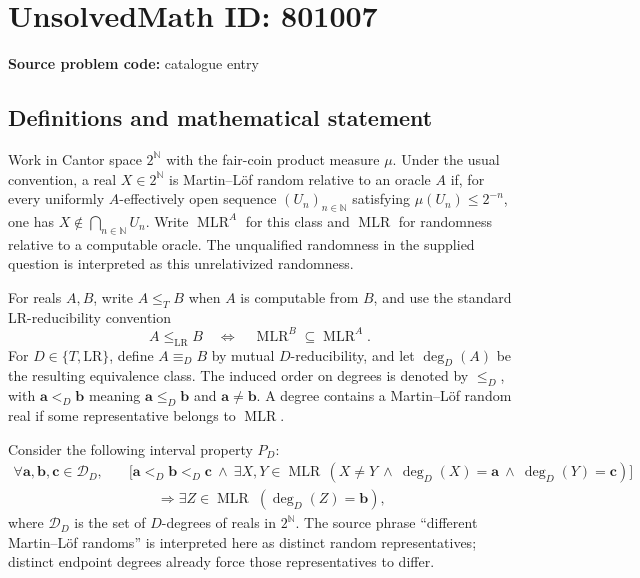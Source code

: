 \documentclass[11pt]{article}
\newcommand{\N}{\mathbb{N}}
\begin{document}
\section*{UnsolvedMath ID: 801007}
\textbf{Source problem code:} catalogue entry
\subsection{Definitions and mathematical statement}
Work in Cantor space $2^{\N}$ with the fair-coin product measure $\mu$. Under the usual convention, a real $X\in 2^{\N}$ is Martin--L\"of random relative to an oracle $A$ if, for every uniformly $A$-effectively open sequence $(U_n)_{n\in\N}$ satisfying $\mu(U_n)\leq 2^{-n}$, one has $X\notin\bigcap_{n\in\N}U_n$. Write $\operatorname{MLR}^{A}$ for this class and $\operatorname{MLR}$ for randomness relative to a computable oracle. The unqualified randomness in the supplied question is interpreted as this unrelativized randomness.

For reals $A,B$, write $A\leq_T B$ when $A$ is computable from $B$, and use the standard LR-reducibility convention
\[
A\leq_{\mathrm{LR}}B
\quad\Longleftrightarrow\quad
\operatorname{MLR}^{B}\subseteq\operatorname{MLR}^{A}.
\]
For $D\in\{T,\mathrm{LR}\}$, define $A\equiv_D B$ by mutual $D$-reducibility, and let $\deg_D(A)$ be the resulting equivalence class. The induced order on degrees is denoted by $\leq_D$, with $\mathbf a<_D\mathbf b$ meaning $\mathbf a\leq_D\mathbf b$ and $\mathbf a\ne\mathbf b$. A degree contains a Martin--L\"of random real if some representative belongs to $\operatorname{MLR}$.

Consider the following interval property $P_D$:
\[
\begin{aligned}
\forall\mathbf a,\mathbf b,\mathbf c\in\mathcal D_D,\quad
&\bigl[\mathbf a<_D\mathbf b<_D\mathbf c
\ \land\ \exists X,Y\in\operatorname{MLR}\,
 (X\ne Y\ \land\ \deg_D(X)=\mathbf a
                 \ \land\ \deg_D(Y)=\mathbf c)\bigr]\\
&\qquad\Longrightarrow
\exists Z\in\operatorname{MLR}\;(\deg_D(Z)=\mathbf b),
\end{aligned}
\]
where $\mathcal D_D$ is the set of $D$-degrees of reals in $2^{\N}$. The source phrase ``different Martin--L\"of randoms'' is interpreted here as distinct random representatives; distinct endpoint degrees already force those representatives to differ.
\end{document}
